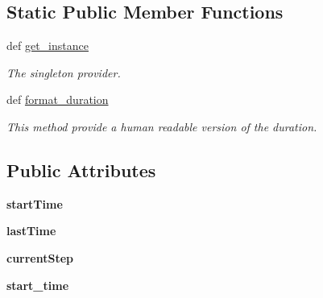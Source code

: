 \subsection*{Static Public Member Functions}
\begin{DoxyCompactItemize}
\item 
\hypertarget{classsrc_1_1core_1_1util_1_1time_1_1Timer_1_1Timer_a24e0933ea73cd3f0a90cec33f8e3ca22}{def \hyperlink{classsrc_1_1core_1_1util_1_1time_1_1Timer_1_1Timer_a24e0933ea73cd3f0a90cec33f8e3ca22}{get\-\_\-instance}}\label{classsrc_1_1core_1_1util_1_1time_1_1Timer_1_1Timer_a24e0933ea73cd3f0a90cec33f8e3ca22}

\begin{DoxyCompactList}\small\item\em The singleton provider. \end{DoxyCompactList}\item 
\hypertarget{classsrc_1_1core_1_1util_1_1time_1_1Timer_1_1Timer_a5a36e0a9aa09c15dcb5c9f774289ec76}{def \hyperlink{classsrc_1_1core_1_1util_1_1time_1_1Timer_1_1Timer_a5a36e0a9aa09c15dcb5c9f774289ec76}{format\-\_\-duration}}\label{classsrc_1_1core_1_1util_1_1time_1_1Timer_1_1Timer_a5a36e0a9aa09c15dcb5c9f774289ec76}

\begin{DoxyCompactList}\small\item\em This method provide a human readable version of the duration. \end{DoxyCompactList}\end{DoxyCompactItemize}
\subsection*{Public Attributes}
\begin{DoxyCompactItemize}
\item 
\hypertarget{classsrc_1_1core_1_1util_1_1time_1_1Timer_1_1Timer_a9a7f81a94ee60e8a690e91b980cc3b08}{{\bfseries start\-Time}}\label{classsrc_1_1core_1_1util_1_1time_1_1Timer_1_1Timer_a9a7f81a94ee60e8a690e91b980cc3b08}

\item 
\hypertarget{classsrc_1_1core_1_1util_1_1time_1_1Timer_1_1Timer_a2359a12c7e04b1b5fb870ebf85a86128}{{\bfseries last\-Time}}\label{classsrc_1_1core_1_1util_1_1time_1_1Timer_1_1Timer_a2359a12c7e04b1b5fb870ebf85a86128}

\item 
\hypertarget{classsrc_1_1core_1_1util_1_1time_1_1Timer_1_1Timer_a752ecbfb08ab0c6b3ec6757e88d3eb2e}{{\bfseries current\-Step}}\label{classsrc_1_1core_1_1util_1_1time_1_1Timer_1_1Timer_a752ecbfb08ab0c6b3ec6757e88d3eb2e}

\item 
\hypertarget{classsrc_1_1core_1_1util_1_1time_1_1Timer_1_1Timer_ac59a1b0e8ced20e2e847364932b84b26}{{\bfseries start\-\_\-time}}\label{classsrc_1_1core_1_1util_1_1time_1_1Timer_1_1Timer_ac59a1b0e8ced20e2e847364932b84b26}

\end{DoxyCompactItemize}


